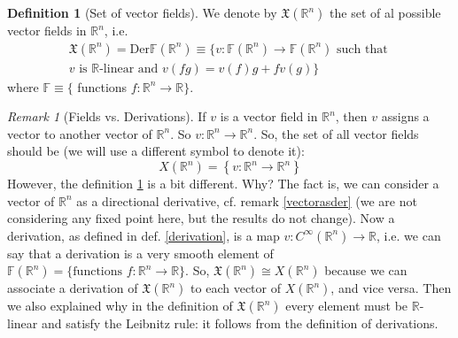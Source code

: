 \documentclass[a4paper,11pt,titlepage]{article}
\numberwithin{equation}{section}
\theoremstyle{definition}
\newtheorem{definition}[theorem]{Definition}
\theoremstyle{remark}
\newtheorem{remark}[theorem]{Remark}
\newcommand{\rfield}{\mathbb{R}}
\begin{document}
\begin{definition} [Set of vector fields] \label{setsfields}
We denote by $\mathfrak{X}(\rfield^n)$ the set of al possible vector fields in $\rfield^n$, i.e.
\begin{align}
\mathfrak{X}(\rfield^n) = \text{Der}\mathbb{F}(\rfield^n) \equiv\{ v \colon \mathbb{F}(\rfield^n) \rightarrow \mathbb{F}(\rfield^n) \text{ such that } \nonumber \\
 v \text{ is } \rfield\text{-linear and } v(fg) = v(f)g + fv(g)  \}
\end{align}
where $\mathbb{F} \equiv \{$ functions $f\colon \rfield^n \rightarrow \rfield \}$.
\end{definition}

\begin{remark} [Fields vs. Derivations] \label{fieldsvsder}
  If $v$ is a vector field in $\rfield^n$, then $v$ assigns a vector to another vector of $\rfield^n$. So $v \colon \rfield^n \rightarrow \rfield^n$. So, the set of all vector fields should be (we will use a different symbol to denote it):
  $$X(\rfield^n) = \left \{ v \colon \rfield^n \rightarrow \rfield^n \right \}$$
  However, the definition \ref{setsfields} is a bit different. Why?
  The fact is, we can consider a vector of $\rfield^n$ as a directional derivative, cf. remark \ref{vectorasder} (we are not considering any fixed point here, but the results do not change). Now a derivation, as defined in def. \ref{derivation}, is a map $v \colon C^{\infty}(\rfield^n) \rightarrow \rfield$, i.e. we can say that a derivation is a very smooth element of $\mathbb{F}(\rfield^n) = \{ \text{functions } f \colon \rfield^n \rightarrow \rfield\}$. So, $\mathfrak{X}(\rfield^n) \cong X(\rfield^n)$ because we can associate a derivation of $\mathfrak{X}(\rfield^n)$ to each vector of $X(\rfield^n)$, and vice versa. Then we also explained why in the definition of $\mathfrak{X}( \rfield^n)$ every element must be $\rfield$-linear and satisfy the Leibnitz rule: it follows from the definition of derivations.


\end{remark}
\end{document}
